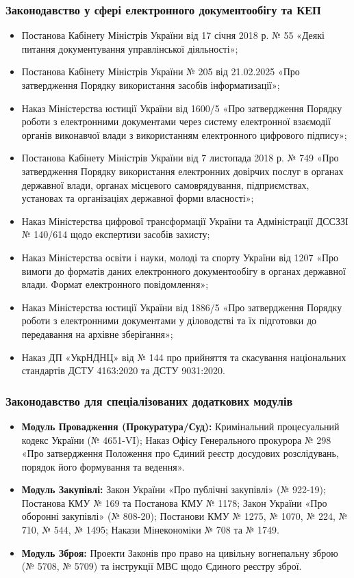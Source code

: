 \documentclass{article}
\begin{document}
\subsubsection{Законодавство у сфері електронного документообігу та КЕП}
\begin{itemize}
    \item Постанова Кабінету Міністрів України від 17 січня 2018 р. № 55 «Деякі питання документування управлінської діяльності»;
    \item Постанова Кабінету Міністрів України № 205 від 21.02.2025 «Про затвердження Порядку використання засобів інформатизації»;
    \item Наказ Міністерства юстиції України від 1600/5 «Про затвердження Порядку роботи з електронними документами через систему електронної взаємодії органів виконавчої влади з використанням електронного цифрового підпису»;
    \item Постанова Кабінету Міністрів України від 7 листопада 2018 р. № 749 «Про затвердження Порядку використання електронних довірчих послуг в органах державної влади, органах місцевого самоврядування, підприємствах, установах та організаціях державної форми власності»;
    \item Наказ Міністерства цифрової трансформації України та Адміністрації ДССЗЗІ № 140/614 щодо експертизи засобів захисту;
    \item Наказ Міністерства освіти і науки, молоді та спорту України від 1207 «Про вимоги до форматів даних електронного документообігу в органах державної влади. Формат електронного повідомлення»;
    \item Наказ Міністерства юстиції України від 1886/5 «Про затвердження Порядку роботи з електронними документами у діловодстві та їх підготовки до передавання на архівне зберігання»;
    \item Наказ ДП «УкрНДНЦ» від № 144 про прийняття та скасування національних стандартів ДСТУ 4163:2020 та ДСТУ 9031:2020.
\end{itemize}

\subsubsection{Законодавство для спеціалізованих додаткових модулів}
\begin{itemize}
    \item \textbf{Модуль Провадження (Прокуратура/Суд):} Кримінальний процесуальний кодекс України (№ 4651-VI); Наказ Офісу Генерального прокурора № 298 «Про затвердження Положення про Єдиний реєстр досудових розслідувань, порядок його формування та ведення».
    \item \textbf{Модуль Закупівлі:} Закон України «Про публічні закупівлі» (№ 922-19); Постанова КМУ № 169 та Постанова КМУ № 1178; Закон України «Про оборонні закупівлі» (№ 808-20); Постанови КМУ № 1275, № 1070, № 224, № 710, № 544, № 1495; Накази Мінекономіки № 708 та № 1749.
    \item \textbf{Модуль Зброя:} Проекти Законів про право на цивільну вогнепальну зброю (№ 5708, № 5709) та інструкції МВС щодо Єдиного реєстру зброї.
\end{itemize}
\end{document}
